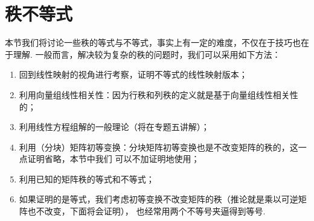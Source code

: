 \section{秩不等式}
本节我们将讨论一些秩的等式与不等式，事实上有一定的难度，不仅在于技巧也在于理解.
一般而言，解决较为复杂的秩的问题时，我们可以采用如下方法：
\begin{enumerate}
    \item 回到线性映射的视角进行考察，证明不等式的线性映射版本；
    \item 利用向量组线性相关性：因为行秩和列秩的定义就是基于向量组线性相关性的；
    \item 利用线性方程组解的一般理论（将在专题五讲解）；
    \item 利用（分块）矩阵初等变换：分块矩阵初等变换也是不改变矩阵的秩的，这一点证明省略，本节中我们
    可以不加证明地使用；
    \item 利用已知的矩阵秩的等式和不等式；
    \item 如果证明的是等式，我们考虑初等变换不改变矩阵的秩（推论就是乘以可逆矩阵也不改变，下面将会证明），
    也经常用两个不等号夹逼得到等号.
\end{enumerate}

